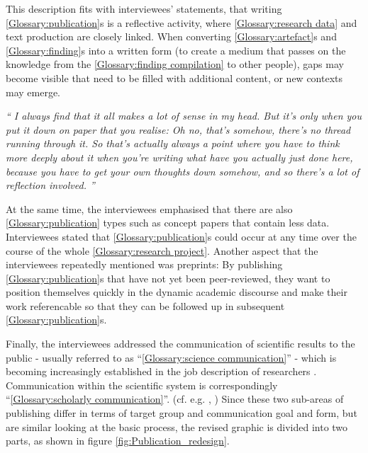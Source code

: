 \documentclass{bausteinefdm}
\begin{document}
This description fits with interviewees' statements, that writing \ref{Glossary:publication}s is a reflective activity, where \ref{Glossary:research data} and text production are closely linked.
When converting \ref{Glossary:artefact}s and \ref{Glossary:finding}s into a written form (to create a medium that passes on the knowledge from the \ref{Glossary:finding compilation} to other people), gaps may become visible that need to be filled with additional content, or new contexts may emerge.

\hfill\begin{minipage}{\dimexpr\textwidth-0.5cm}
    \textit{
        \enquote{
            I always find that it all makes a lot of sense in my head. 
            But it's only when you put it down on paper that you realise: 
            Oh no, that's somehow, there's no thread running through it. 
            So that's actually always a point where you have to think more deeply about it when you're writing what have you actually just done here, because you have to get your own thoughts down somehow, and so there's a lot of reflection involved.
        } %
    }
\end{minipage}

At the same time, the interviewees emphasised that there are also \ref{Glossary:publication} types such as concept papers that contain less data.
Interviewees stated that \ref{Glossary:publication}s could occur at any time over the course of the whole \ref{Glossary:research project}.
Another aspect that the interviewees repeatedly mentioned was preprints: 
By publishing \ref{Glossary:publication}s that have not yet been peer-reviewed, they want to position themselves quickly in the dynamic academic discourse and make their work referencable so that they can be followed up in subsequent \ref{Glossary:publication}s.

Finally, the interviewees addressed the communication of scientific results to the public - usually referred to as \enquote{\ref{Glossary:science communication}} - which is becoming increasingly established in the job description of researchers \cite{Konneker.2012}.
Communication within the scientific system is correspondingly \enquote{\ref{Glossary:scholarly communication}}. (cf. e.g. \cite{Hagenhoff.2007}, \cite{Burns.2003}) 
Since these two sub-areas of publishing differ in terms of target group and communication goal and form, but are similar looking at the basic process, the revised graphic is divided into two parts, as shown in figure \ref{fig:Publication_redesign}. 
\end{document}
